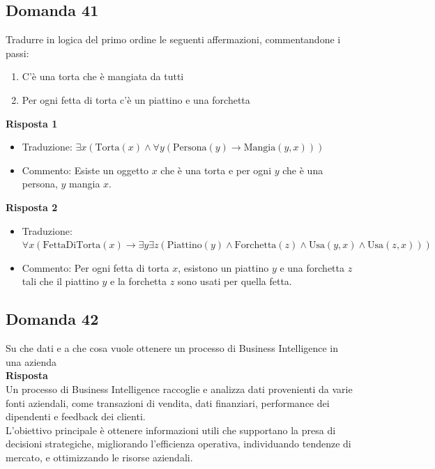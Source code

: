 \documentclass[../main.tex]{subfiles}
\begin{document}
	\subsection{Domanda 41}
	Tradurre in logica del primo ordine le seguenti affermazioni, commentandone i passi:
	\begin{enumerate}
		\item C’è una torta che è mangiata da tutti 
		\item Per ogni fetta di torta c’è un piattino e una forchetta
	\end{enumerate}
	\textbf{Risposta 1}
	\begin{itemize}
		\item Traduzione: $\exists x (\text{Torta}(x) \land \forall y (\text{Persona}(y) \rightarrow \text{Mangia}(y, x)))$
		\item Commento: Esiste un oggetto $x$ che è una torta e per ogni $y$ che è una persona, $y$ mangia $x$.
	\end{itemize}
	\textbf{Risposta 2}
	\begin{itemize}
		\item Traduzione: $\forall x (\text{FettaDiTorta}(x) \rightarrow \exists y \exists z (\text{Piattino}(y) \land \text{Forchetta}(z) \land \text{Usa}(y, x) \land \text{Usa}(z, x)))$
		\item Commento: Per ogni fetta di torta $x$, esistono un piattino $y$ e una forchetta $z$ tali che il piattino $y$ e la forchetta $z$ sono usati per quella fetta.
	\end{itemize}
	\subsection{Domanda 42}
	Su che dati e a che cosa vuole ottenere un processo di Business Intelligence in una azienda\\
	\textbf{Risposta}\\
	Un processo di Business Intelligence raccoglie e analizza dati provenienti da varie fonti aziendali, come transazioni di vendita, dati finanziari, performance dei dipendenti e feedback dei clienti. \\
	L'obiettivo principale è ottenere informazioni utili che supportano la presa di decisioni strategiche, migliorando l'efficienza operativa, individuando tendenze di mercato, e ottimizzando le risorse aziendali.
\end{document}

